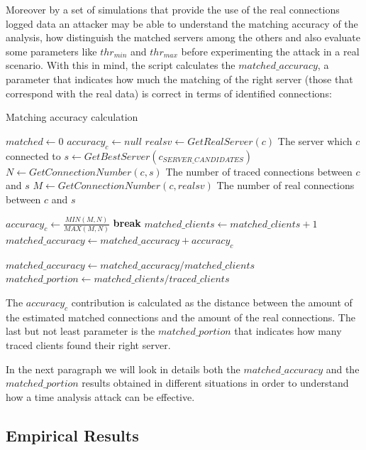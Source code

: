 Moreover by a set of simulations
that provide the use of the real connections logged data an attacker
may be able to understand the matching accuracy of the analysis, how distinguish the
matched servers among the others and also evaluate some
parameters like $thr_{min}$ and $thr_{max}$ before 
experimenting the attack in a real scenario. 
With this in mind, the script
calculates the $matched\_accuracy$, a parameter that indicates how much
the matching of the right server (those that correspond with the real
data) is correct in terms of identified
connections:

\begin{algorithm}[H]
\caption{Matching accuracy calculation}
\begin{algorithmic}
\State $matched \gets 0$
	\State $accuracy_c \gets null$
	\State $realsv \gets GetRealServer(c)$ 
	{\footnotesize \Comment The server which $c$ connected to}
	\State $s \gets GetBestServer(c_{SERVER\_CANDIDATES})$
		\State $N \gets GetConnectionNumber(c, s) $ 
		{\footnotesize \Comment The number of traced connections between $c$ and $s$}
		\State $M \gets GetConnectionNumber(c, realsv)$ 
		{\footnotesize \Comment The number of real connections between $c$ and $s$}

		\State $accuracy_c \gets \frac{ MIN(M, N)}{MAX(M, N)}$
	\State \textbf{break}
	\EndIf
		\State $matched\_clients \gets matched\_clients + 1$
		\State $matched\_accuracy \gets matched\_accuracy + accuracy_c$
	\EndIf	
\EndFor

\State $matched\_accuracy \gets matched\_accuracy / matched\_clients$
\State $matched\_portion \gets matched\_clients / traced\_clients$

\end{algorithmic}
\label{alg:launcher}
\end{algorithm}
 
The $accuracy_c$ contribution is calculated as the distance between the 
amount of the estimated matched connections
and the amount of the real connections.
The last but not least parameter is the $matched\_portion$ that indicates
how many traced clients found their right server. 


In the next paragraph we will look in details both the
$matched\_accuracy$ and the
$matched\_portion$
results obtained in different situations in order to understand how a
time analysis attack can be effective.

\newpage
\subsection{Empirical Results}

